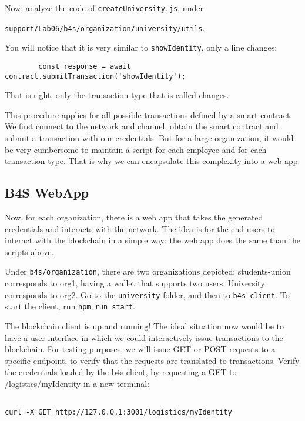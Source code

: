 \documentclass[12pt,a4paper]{article}
\theoremstyle{definition}
\begin{document}
Now, analyze the code of \texttt{createUniversity.js}, under 

\texttt{support/Lab06/b4s/organization/university/utils}. 

You will notice that it is very similar to \texttt{showIdentity}, only a line changes:
\begin{verbatim}
        const response = await contract.submitTransaction('showIdentity');
\end{verbatim}

That is right, only the transaction type that is called changes.


This procedure applies for all possible transactions defined by a smart contract. We first connect to the network and channel, obtain the smart contract and submit a transaction with our credentials. But for a large organization, it would be very cumbersome to maintain a script for each employee and for each transaction type. That is why we can encapsulate this complexity into a web app.



\subsection{B4S WebApp}
Now, for each organization, there is a web app that takes the generated credentials and interacts with the network. The idea is for the end users to interact with the blockchain in a simple way: the web app does the same than the scripts above. 

Under \texttt{b4s/organization}, there are two organizations depicted: students-union corresponds to org1, having a wallet that supports two users. University corresponds to org2. Go to the \texttt{university} folder, and then to \texttt{b4s-client}. To start the client, run \texttt{npm run start}. 

The blockchain client is up and running! The ideal situation now would be to have a user interface in which we could interactively issue transactions to the blockchain. For testing purposes, we will issue GET or POST requests to a specific endpoint, to verify that the requests are translated to transactions. Verify the credentials loaded by the b4s-client, by requesting a GET to /logistics/myIdentity in a new terminal:
\begin{verbatim}

curl -X GET http://127.0.0.1:3001/logistics/myIdentity
\end{verbatim}
\end{document}
